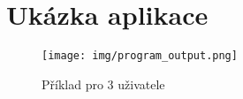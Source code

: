 \chapter{Ukázka aplikace}

\begin{figure}[htbp]
  \centering
  \texttt{[image: img/program\_output.png]}
  \caption{Příklad pro 3 uživatele}
  \label{program_output}
\end{figure}